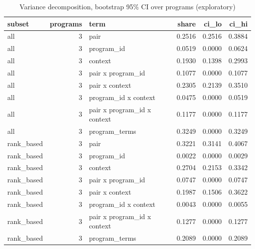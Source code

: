 \begin{table}[t]
\centering
\caption{Variance decomposition, bootstrap 95\% CI over programs (exploratory)}
\label{tab:v3-1-variance-decomposition}
\begin{tabular}{lrlrrr}
\toprule
subset & programs & term & share & ci\_lo & ci\_hi \\
\midrule
all & 3 & pair & 0.2516 & 0.2516 & 0.3884 \\
all & 3 & program\_id & 0.0519 & 0.0000 & 0.0624 \\
all & 3 & context & 0.1930 & 0.1398 & 0.2993 \\
all & 3 & pair x program\_id & 0.1077 & 0.0000 & 0.1077 \\
all & 3 & pair x context & 0.2305 & 0.2139 & 0.3510 \\
all & 3 & program\_id x context & 0.0475 & 0.0000 & 0.0519 \\
all & 3 & pair x program\_id x context & 0.1177 & 0.0000 & 0.1177 \\
all & 3 & program\_terms & 0.3249 & 0.0000 & 0.3249 \\
rank\_based & 3 & pair & 0.3221 & 0.3141 & 0.4067 \\
rank\_based & 3 & program\_id & 0.0022 & 0.0000 & 0.0029 \\
rank\_based & 3 & context & 0.2704 & 0.2153 & 0.3342 \\
rank\_based & 3 & pair x program\_id & 0.0747 & 0.0000 & 0.0747 \\
rank\_based & 3 & pair x context & 0.1987 & 0.1506 & 0.3622 \\
rank\_based & 3 & program\_id x context & 0.0043 & 0.0000 & 0.0055 \\
rank\_based & 3 & pair x program\_id x context & 0.1277 & 0.0000 & 0.1277 \\
rank\_based & 3 & program\_terms & 0.2089 & 0.0000 & 0.2089 \\
\bottomrule
\end{tabular}
\end{table}
